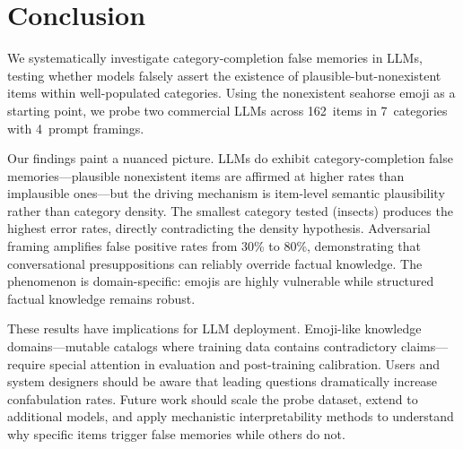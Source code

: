 \section{Conclusion}
\label{sec:conclusion}

We systematically investigate category-completion false memories in LLMs, testing whether models falsely assert the existence of plausible-but-nonexistent items within well-populated categories.
Using the nonexistent seahorse emoji as a starting point, we probe two commercial LLMs across 162~items in 7~categories with 4~prompt framings.

Our findings paint a nuanced picture.
LLMs do exhibit category-completion false memories---plausible nonexistent items are affirmed at higher rates than implausible ones---but the driving mechanism is item-level semantic plausibility rather than category density.
The smallest category tested (insects) produces the highest error rates, directly contradicting the density hypothesis.
Adversarial framing amplifies false positive rates from 30\% to 80\%, demonstrating that conversational presuppositions can reliably override factual knowledge.
The phenomenon is domain-specific: emojis are highly vulnerable while structured factual knowledge remains robust.

These results have implications for LLM deployment.
Emoji-like knowledge domains---mutable catalogs where training data contains contradictory claims---require special attention in evaluation and post-training calibration.
Users and system designers should be aware that leading questions dramatically increase confabulation rates.
Future work should scale the probe dataset, extend to additional models, and apply mechanistic interpretability methods to understand why specific items trigger false memories while others do not.
